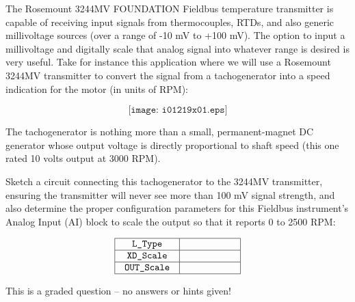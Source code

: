 

The Rosemount 3244MV FOUNDATION Fieldbus temperature transmitter is capable of receiving input signals from thermocouples, RTDs, and also generic millivoltage sources (over a range of -10 mV to +100 mV).  The option to input a millivoltage and digitally scale that analog signal into whatever range is desired is very useful.  Take for instance this application where we will use a Rosemount 3244MV transmitter to convert the signal from a tachogenerator into a speed indication for the motor (in units of RPM):

$$\texttt{[image: i01219x01.eps]}$$

The tachogenerator is nothing more than a small, permanent-magnet DC generator whose output voltage is directly proportional to shaft speed (this one rated 10 volts output at 3000 RPM).

\vskip 10pt

Sketch a circuit connecting this tachogenerator to the 3244MV transmitter, ensuring the transmitter will never see more than 100 mV signal strength, and also determine the proper configuration parameters for this Fieldbus instrument's Analog Input (AI) block to scale the output so that it reports 0 to 2500 RPM:


$$\vbox{\offinterlineskip
\halign{\strut
\vrule \quad\hfil # \ \hfil & 
\vrule \quad\hfil # \ \hfil \vrule \cr
\noalign{\hrule}
%
{\tt L\_Type} & \hskip 50pt \cr
%
\noalign{\hrule}
%
{\tt XD\_Scale} & \hskip 50pt \cr
%
\noalign{\hrule}
%
{\tt OUT\_Scale} & \hskip 50pt \cr
%
\noalign{\hrule}
} %
}$$ %

\vfil 

\eject






This is a graded question -- no answers or hints given!






